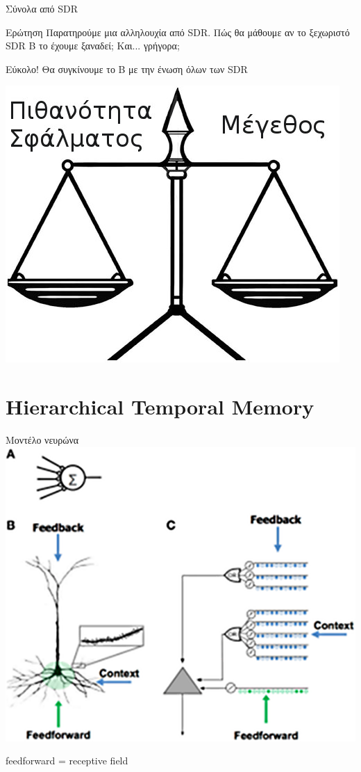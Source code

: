 \documentclass[11pt,center]{beamer}
\begin{document}

\begin{frame} {Σύνολα από SDR}
  \begin{block}{Ερώτηση}
    Παρατηρούμε μια αλληλουχία από SDR. Πώς θα μάθουμε αν το ξεχωριστό SDR Β το έχουμε ξαναδεί; Και... γρήγορα;
  \end{block}

  \pause
  \vspace{1em}
  \begin{block}{Εύκολο!}
	Θα συγκίνουμε το Β με την \alert{ένωση} όλων των SDR
  \end{block}

  \pause
  \vspace{0.5em}
  \centering
  \includegraphics[width=.5\textwidth]{../pics/balance}
\end{frame}

\section{Hierarchical Temporal Memory}

\begin{frame}{Μοντέλο νευρώνα}
  \centering
  \includegraphics[width=.75\textwidth]{../pics/neuron-model}

  feedforward = receptive field
\end{frame}
\end{document}
